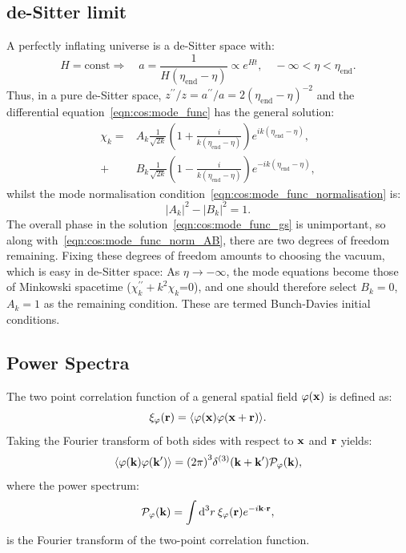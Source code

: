 \subsection{de-Sitter limit}
A perfectly inflating universe is a de-Sitter space with:
\begin{equation}
  H=\text{const}\Rightarrow \quad a = \frac{1}{H(\eta_\mathrm{end}-\eta)} \propto e^{Ht}, \quad -\infty<\eta<\eta_\mathrm{end}.
  \label{eqn:cos:de-sitter}
\end{equation}
Thus, in a pure de-Sitter space, ${z^{\prime\prime}/z = a^{\prime\prime}/a= 2{(\eta_\mathrm{end}-\eta)}^{-2}}$ and the differential equation~\eqref{eqn:cos:mode_func} has the general solution:
\begin{align}
  \chi_k = &A_k \frac{1}{\sqrt{2k}}\left( 1+\frac{i}{k(\eta_\mathrm{end}-\eta)} \right)e^{ik(\eta_\mathrm{end}-\eta)}, \nonumber\\
  + &B_k \frac{1}{\sqrt{2k}}\left( 1-\frac{i}{k(\eta_\mathrm{end}-\eta)} \right)e^{-ik(\eta_\mathrm{end}-\eta)},
  \label{eqn:cos:mode_func_gs}
\end{align}
whilst the mode normalisation condition~\eqref{eqn:cos:mode_func_normalisation} is:
\begin{equation}
  |A_k|^2 - |B_k|^2 = 1.
  \label{eqn:cos:mode_func_norm_AB}
\end{equation}
The overall phase in the solution~\eqref{eqn:cos:mode_func_gs} is unimportant, so along with~\eqref{eqn:cos:mode_func_norm_AB}, there are two degrees of freedom remaining. Fixing these degrees of freedom amounts to choosing the vacuum, which is easy in de-Sitter space: As $\eta\rightarrow -\infty$, the mode equations become those of Minkowski spacetime ($\chi_k^{\prime\prime} +k^2 \chi_k$=0), and one should therefore select $B_k=0$, $A_k=1$ as the remaining condition. These are termed Bunch-Davies initial conditions.

\subsection{Power Spectra}
The two point correlation function of a general spatial field $\varphi(\vx)$ is defined as:
\begin{equation}
  \xi_\varphi(\vr) = \mean{\varphi(\vx)\varphi(\vx + \vr)}.
\end{equation}
Taking the Fourier transform of both sides with respect to $\vx$ and $\vr$ yields:
\begin{equation}
  \mean{\varphi(\vk)\varphi(\vk^{\prime})} = {\left( 2\pi \right)}^3\delta^{(3)}(\vk + \vk^{\prime}) \mathcal{P}_\varphi(\vk),
  \label{eqn:cos:power_spectrum_definition}
\end{equation}
where the power spectrum:
\begin{equation}
  \mathcal{P}_\varphi(\vk) = \int \d[3]{r}\: \xi_\varphi(\vr)e^{-i\vk\cdot\vr},
\end{equation}
is the Fourier transform of the two-point correlation function.

